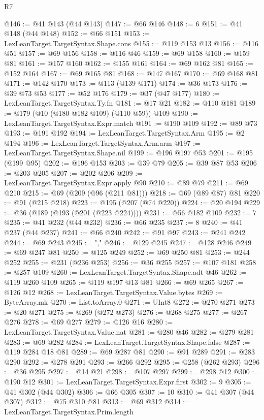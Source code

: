 \begin{lexlean}{R7}
\begin{coremodule}
@146 := @41 @143 (@44 @143)
@147 := @66 @146
@148 := 6
@151 := @41 @148 (@44 @148)
@152 := @66 @151
@153 := LexLeanTarget.TargetSyntax.Shape.cons
@155 := @119 @153 @13
@156 := @116 @51
@157 := @69 @156
@158 := @116 @46
@159 := @69 @158
@160 := @159 @81
@161 := @157 @160
@162 := @155 @161
@164 := @69 @162 @81
@165 := @152 @164
@167 := @69 @165 @81
@168 := @147 @167
@170 := @69 @168 @81
@171 := @142 @170
@173 := @113 (@139 @171)
@174 := @36 @173
@176 := @39 @73 @53
@177 := @52 @176
@179 := @37 (@47 @177)
@180 := LexLeanTarget.TargetSyntax.Ty.fn
@181 := @17 @21
@182 := @110 @181
@189 := @179 (@10 (@180 @182 @109) (@110 @59)) @109
@190 := LexLeanTarget.TargetSyntax.Expr.match
@191 := @190 @109
@192 := @89 @73
@193 := @191 @192
@194 := LexLeanTarget.TargetSyntax.Arm
@195 := @2 @194
@196 := LexLeanTarget.TargetSyntax.Arm.arm
@197 := LexLeanTarget.TargetSyntax.Shape.nil
@199 := @196 @197 @53
@201 := @195 (@199 @95)
@202 := @196 @153
@203 := @39 @79
@205 := @39 @87 @53
@206 := @203 @205
@207 := @202 @206
@209 := LexLeanTarget.TargetSyntax.Expr.apply @90
@210 := @89 @79
@211 := @69 @210
@215 := @69 (@209 (@96 (@211 @81)))
@218 := @69 (@89 @87) @81
@220 := @91 (@215 @218)
@223 := @195 (@207 (@74 @220))
@224 := @20 @194
@229 := @36 (@189 (@193 (@201 (@223 @224))))
@231 := @56 @182 @109
@232 := 7
@235 := @41 @232 (@44 @232)
@236 := @66 @235
@237 := 8
@240 := @41 @237 (@44 @237)
@241 := @66 @240
@242 := @91 @97
@243 := @241 @242
@244 := @69 @243
@245 := ","
@246 := @129 @245
@247 := @128 @246
@249 := @69 @247 @81
@250 := @125 @249
@252 := @69 @250 @81
@253 := @244 @252
@255 := @231 (@236 @253)
@256 := @36 @255
@257 := @107 @181
@258 := @257 @109
@260 := LexLeanTarget.TargetSyntax.Shape.adt @46
@262 := @119 @260 @109
@265 := @119 @197 @13 @81
@266 := @69 @265
@267 := @126 @12
@268 := LexLeanTarget.TargetSyntax.Value.bytes
@269 := ByteArray.mk
@270 := List.toArray.{0}
@271 := UInt8
@272 := @270 @271
@273 := @20 @271
@275 := @269 (@272 @273)
@276 := @268 @275
@277 := @267 @276
@278 := @69 @277
@279 := @126 @16
@280 := LexLeanTarget.TargetSyntax.Value.nat
@281 := @280 @46
@282 := @279 @281
@283 := @69 @282
@284 := LexLeanTarget.TargetSyntax.Shape.false
@287 := @119 @284 @18 @81
@289 := @69 @287 @81
@290 := @91 @289
@291 := @283 @290
@292 := @278 @291
@293 := @266 @292
@295 := @258 (@262 @293)
@296 := @36 @295
@297 := @14 @21
@298 := @107 @297
@299 := @298 @12
@300 := @190 @12
@301 := LexLeanTarget.TargetSyntax.Expr.first
@302 := 9
@305 := @41 @302 (@44 @302)
@306 := @66 @305
@307 := 10
@310 := @41 @307 (@44 @307)
@312 := @75 @310 @81
@313 := @69 @312
@314 := LexLeanTarget.TargetSyntax.Prim.length

\end{coremodule}
\end{lexlean}
